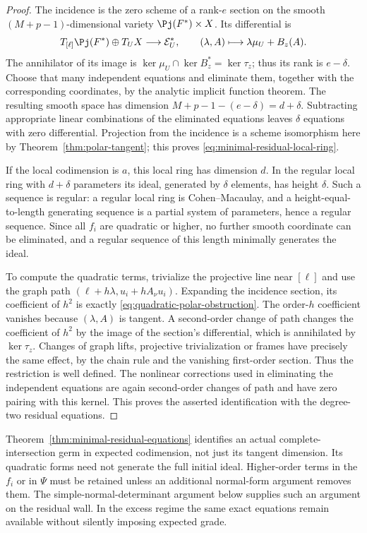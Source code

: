 \begin{proof}
The incidence is the zero scheme of a rank-$e$ section on the smooth
$(M+p-1)$-dimensional variety $\Pj(F^*)\times X$.
Its differential is
\[
 T_{[\ell]}\Pj(F^*)\oplus T_UX\longrightarrow\mathcal E_U^*,
       \qquad (\lambda,A)\longmapsto\lambda\mu_U+B_z(A).
\]
The annihilator of its image is
$\ker\mu_U\cap\ker B_z^*=\ker\tau_z$; thus its rank is
$e-\delta$. Choose that many independent equations and eliminate
them, together with the corresponding coordinates, by the analytic
implicit function theorem. The resulting smooth space has dimension
$M+p-1-(e-\delta)=d+\delta$. Subtracting appropriate linear
combinations of the eliminated equations leaves $\delta$ equations
with zero differential. Projection from the incidence is a scheme
isomorphism here by Theorem~\ref{thm:polar-tangent}; this proves
\eqref{eq:minimal-residual-local-ring}.

If the local codimension is $a$, this local ring has dimension $d$.
In the regular local ring with $d+\delta$ parameters its ideal,
generated by $\delta$ elements, has height $\delta$. Such a
sequence is regular: a regular local ring is Cohen--Macaulay, and
a height-equal-to-length generating sequence is a partial system of
parameters, hence a regular sequence. Since all $f_i$ are quadratic
or higher, no further smooth coordinate can be eliminated, and a
regular sequence of this length minimally generates the ideal.

To compute the quadratic terms, trivialize the projective line near
$[\ell]$ and use the graph path
$(\ell+h\lambda,u_i+hA_\nu u_i)$. Expanding the incidence section,
its coefficient of $h^2$ is exactly
\eqref{eq:quadratic-polar-obstruction}. The order-$h$ coefficient
vanishes because $(\lambda,A)$ is tangent. A second-order change of
path changes the coefficient of $h^2$ by the image of the section's
differential, which is annihilated by $\ker\tau_z$. Changes of graph
lifts, projective trivialization or frames have precisely the same
effect, by the chain rule and the vanishing first-order section.
Thus the restriction is well defined. The nonlinear corrections used
in eliminating the independent equations are again second-order
changes of path and have zero pairing with this kernel. This proves
the asserted identification with the degree-two residual equations.
\end{proof}

\begin{remark}\label{rem:higher-residual-terms}
Theorem~\ref{thm:minimal-residual-equations} identifies an actual
complete-intersection germ in expected codimension, not just its
tangent dimension. Its quadratic forms need not generate the full
initial ideal. Higher-order terms in the $f_i$ or in $\Psi$ must be
retained unless an additional normal-form argument removes them.
The simple-normal-determinant argument below supplies such an
argument on the residual wall. In the excess regime the same exact
equations remain available without silently imposing expected grade.
\end{remark}


